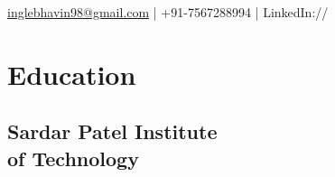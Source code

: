 \documentclass[]{deedy-resume-openfont}
\begin{document}
%
%
%
%
{\href{mailto:inglebhavin98@gmail.com}{inglebhavin98@gmail.com} | +91-7567288994 | LinkedIn:// \href{https://www.linkedin.com/in/inglebhavin98/}{}}
%
%

\begin{minipage}[t]{0.32\textwidth} 


\section{Education} 
\vspace{1mm}
\subsection{Sardar Patel Institute\\of Technology}
{}
\sectionsep





\end{minipage}
\end{document}
